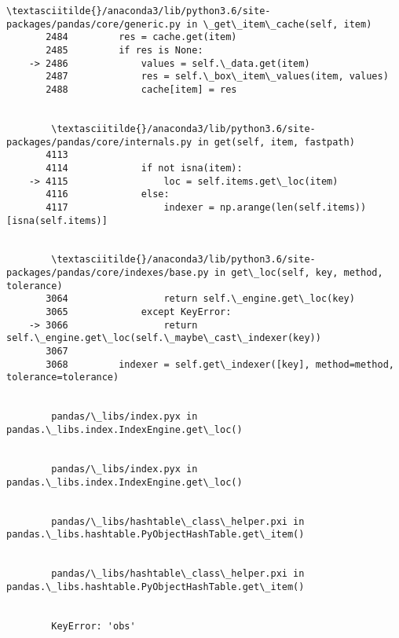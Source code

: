 \documentclass[11pt]{article}
\begin{document}
\begin{Verbatim}[commandchars=\\\{\}]
        \textasciitilde{}/anaconda3/lib/python3.6/site-packages/pandas/core/generic.py in \_get\_item\_cache(self, item)
       2484         res = cache.get(item)
       2485         if res is None:
    -> 2486             values = self.\_data.get(item)
       2487             res = self.\_box\_item\_values(item, values)
       2488             cache[item] = res


        \textasciitilde{}/anaconda3/lib/python3.6/site-packages/pandas/core/internals.py in get(self, item, fastpath)
       4113 
       4114             if not isna(item):
    -> 4115                 loc = self.items.get\_loc(item)
       4116             else:
       4117                 indexer = np.arange(len(self.items))[isna(self.items)]


        \textasciitilde{}/anaconda3/lib/python3.6/site-packages/pandas/core/indexes/base.py in get\_loc(self, key, method, tolerance)
       3064                 return self.\_engine.get\_loc(key)
       3065             except KeyError:
    -> 3066                 return self.\_engine.get\_loc(self.\_maybe\_cast\_indexer(key))
       3067 
       3068         indexer = self.get\_indexer([key], method=method, tolerance=tolerance)


        pandas/\_libs/index.pyx in pandas.\_libs.index.IndexEngine.get\_loc()


        pandas/\_libs/index.pyx in pandas.\_libs.index.IndexEngine.get\_loc()


        pandas/\_libs/hashtable\_class\_helper.pxi in pandas.\_libs.hashtable.PyObjectHashTable.get\_item()


        pandas/\_libs/hashtable\_class\_helper.pxi in pandas.\_libs.hashtable.PyObjectHashTable.get\_item()


        KeyError: 'obs'

    \end{Verbatim}

    \begin{center}
    \end{center}
    { \hspace*{\fill} \\}
    
\end{document}
